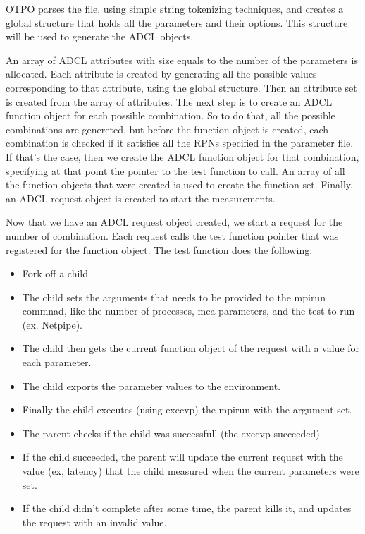 OTPO parses the file, using simple string tokenizing techniques, and creates a
global structure that holds all the parameters and their options. This
structure will be used to generate the ADCL objects. 

An array of ADCL attributes with size equals to the number of the parameters
is allocated. Each attribute is created by generating all the possible values
corresponding to that attribute, using the global structure. Then an attribute
set is created from the array of attributes. The next step is to create an
ADCL function object for each possible combination. So to do that, all the
possible combinations are genereted, but before the function object is
created, each combination is checked if it satisfies all the RPNs specified in
the parameter file. If that's the case, then we create the ADCL function
object for that combination, specifying at that point the pointer to the test
function to call. An array of all the function objects that were created is
used to create the function set. Finally, an ADCL request object is created to
start the measurements.

Now that we have an ADCL request object created, we start a request for the
number of combination. Each request calls the test function pointer that was
registered for the function object. The test function does the following:
\begin{itemize}
\item Fork off a child
\item The child sets the arguments that needs to be provided to the mpirun
  commnad, like the number of processes, mca parameters, and the test to run
  (ex. Netpipe).
\item The child then gets the current function object of the request with a
  value for each parameter.
\item The child exports the parameter values to the environment.
\item Finally the child executes (using execvp) the mpirun with the argument
  set.
\item The parent checks if the child was successfull (the execvp succeeded)
\item If the child succeeded, the parent will update the current request with
  the value (ex, latency) that the child measured when the current parameters
  were set.
\item If the child didn't complete after some time, the parent kills it, and
  updates the request with an invalid value.
\end{itemize}

